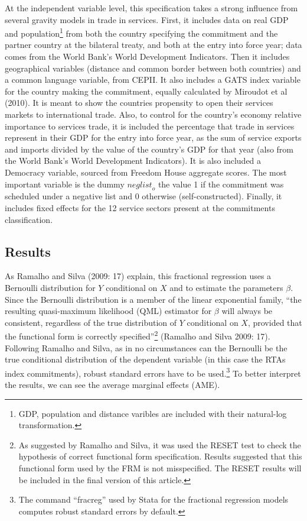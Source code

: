 \documentclass{article}
\begin{document}
At the independent variable level, this specification takes a strong influence from several gravity models in trade in services. First, it includes data on real GDP and population\footnote{GDP, population and distance varibles are included with their natural-log transformation.} from both the country specifying the commitment and the partner country at the bilateral treaty, and both at the entry into force year; data comes from the World Bank’s World Development Indicators. Then it includes geographical variables (distance and common border between both countries) and a common language variable, from CEPII. It also includes a GATS index variable for the country making the commitment, equally calculated by Miroudot et al (2010). It is meant to show the countries propensity to open their services markets to international trade. Also, to control for the country’s economy relative importance to services trade, it is included the percentage that trade in services represent in their GDP for the entry into force year, as the sum of service exports and imports divided by the value of the country’s GDP for that year (also from the World Bank’s World Development Indicators). It is also included a Democracy variable, sourced from Freedom House aggregate scores. The most important variable is the dummy $\textit{neglist}_o$ the value 1 if the commitment was scheduled under a negative list and 0 otherwise (self-constructed). Finally, it includes fixed effects for the 12 service sectors present at the commitments classification.

\subsection{Results}


As Ramalho and Silva (2009: 17) explain, this fractional regression uses a Bernoulli distribution for $Y$ conditional on $X$ and to estimate the parameters $\beta$. Since the Bernoulli distribution is a member of the linear exponential family, “the resulting quasi-maximum likelihood (QML) estimator for $\beta$ will always be consistent, regardless of the true distribution of $Y$ conditional on $X$, provided that the functional form is correctly specified”\footnote{As suggested by Ramalho and Silva, it was used the RESET test to check the hypothesis of correct functional form specification. Results suggested that this functional form used by the FRM is not misspecified. The RESET results will be included in the final version of this article.} (Ramalho and Silva 2009: 17). Following Ramalho and Silva, as in no circumstances can the Bernoulli be the true conditional distribution of the dependent variable (in this case the RTAs index commitments), robust standard errors have to be used.\footnote{The command “fracreg” used by Stata for the fractional regression models computes robust standard errors by default.} To better interpret the results, we can see the average marginal effects (AME).
\end{document}
